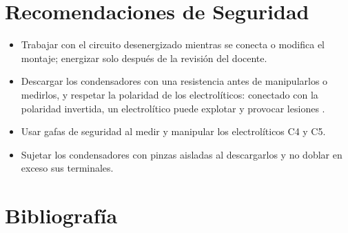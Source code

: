 \documentclass[12pt]{article}
\begin{document}
\section{Recomendaciones de Seguridad}\label{sec:seguridad}
\begin{itemize}
  \item Trabajar con el circuito desenergizado mientras se conecta o modifica el montaje; energizar solo después de la revisión del docente.
  \item Descargar los condensadores con una resistencia antes de manipularlos o medirlos, y respetar la polaridad de los electrolíticos: conectado con la polaridad invertida, un electrolítico puede explotar y provocar lesiones \cite{ref1}.
  \item Usar gafas de seguridad al medir y manipular los electrolíticos C4 y C5.
  \item Sujetar los condensadores con pinzas aisladas al descargarlos y no doblar en exceso sus terminales.
\end{itemize}

\section{Bibliografía}\label{sec:bibliografia}
\nocite{*}
\bibliografia
\end{document}
